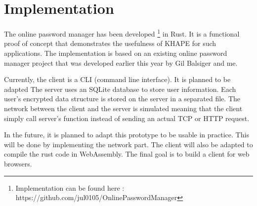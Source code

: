 \documentclass[../report.tex]{subfiles}
\begin{document}
\section{Implementation}
% 

The online password manager has been developed \footnote{Implementation can be found here : https://github.com/jul0105/OnlinePasswordManager} in Rust. It is a functional proof of concept that demonstrates the usefulness of KHAPE for such applications.
The implementation is based on an existing online password manager project that was developed earlier this year by Gil Balsiger and me.

Currently, the client is a CLI (command line interface). It is planned to be adapted
The server uses an SQLite database to store user information. Each user's encrypted data structure is stored on the server in a separated file. 
The network between the client and the server is simulated meaning that the client simply call server’s function instead of sending an actual TCP or HTTP request.

In the future, it is planned to adapt this prototype to be usable in practice. This will be done by implementing the network part. The client will also be adapted to compile the rust code in WebAssembly. The final goal is to build a client for web browsers.
\end{document}
